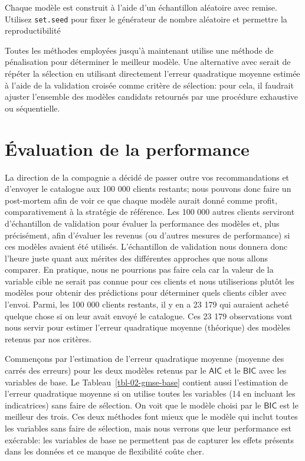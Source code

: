 \documentclass[
  11pt,
  letterpaper,
]{book}
\theoremstyle{definition}
\theoremstyle{remark}
\begin{document}
Chaque modèle est construit à l'aide d'un échantillon aléatoire avec
remise. Utilisez \texttt{set.seed} pour fixer le générateur de nombre
aléatoire et permettre la reproductibilité

Toutes les méthodes employées jusqu'à maintenant utilise une méthode de
pénalisation pour déterminer le meilleur modèle. Une alternative avec
serait de répéter la sélection en utilisant directement l'erreur
quadratique moyenne estimée à l'aide de la validation croisée comme
critère de sélection: pour cela, il faudrait ajuster l'ensemble des
modèles candidats retournés par une procédure exhaustive ou
séquentielle.

\hypertarget{uxe9valuation-de-la-performance}{%
\section{Évaluation de la
performance}\label{uxe9valuation-de-la-performance}}

La direction de la compagnie a décidé de passer outre vos
recommandations et d'envoyer le catalogue aux 100 000 clients restants;
nous pouvons donc faire un post-mortem afin de voir ce que chaque modèle
aurait donné comme profit, comparativement à la stratégie de référence.
Les 100 000 autres clients serviront d'échantillon de validation pour
évaluer la performance des modèles et, plus précisément, afin d'évaluer
les revenus (ou d'autres mesures de performance) si ces modèles avaient
été utilisés. L'échantillon de validation nous donnera donc l'heure
juste quant aux mérites des différentes approches que nous allons
comparer. En pratique, nous ne pourrions pas faire cela car la valeur de
la variable cible ne serait pas connue pour ces clients et nous
utiliserions plutôt les modèles pour obtenir des prédictions pour
déterminer quels clients cibler avec l'envoi. Parmi, les 100 000 clients
restants, il y en a 23 179 qui auraient acheté quelque chose si on leur
avait envoyé le catalogue. Ces 23 179 observations vont nous servir pour
estimer l'erreur quadratique moyenne (théorique) des modèles retenus par
nos critères.

Commençons par l'estimation de l'erreur quadratique moyenne (moyenne des
carrés des erreurs) pour les deux modèles retenus par le
\(\mathsf{AIC}\) et le \(\mathsf{BIC}\) avec les variables de base. Le
Tableau~\ref{tbl-02-gmse-base} contient aussi l'estimation de l'erreur
quadratique moyenne si on utilise toutes les variables (14 en incluant
les indicatrices) sans faire de sélection. On voit que le modèle choisi
par le \(\mathsf{BIC}\) est le meilleur des trois. Ces deux méthodes
font mieux que le modèle qui inclut toutes les variables sans faire de
sélection, mais nous verrons que leur performance est exécrable: les
variables de base ne permettent pas de capturer les effets présents dans
les données et ce manque de flexibilité coûte cher.
\end{document}
